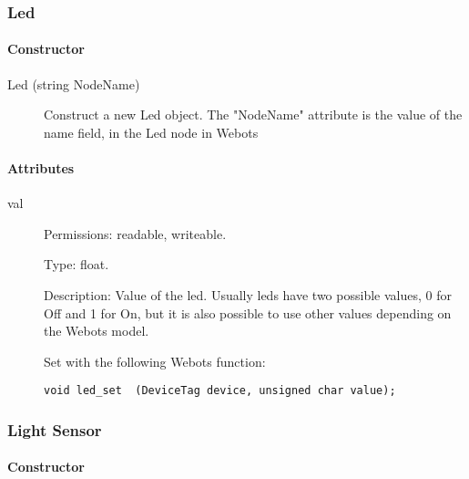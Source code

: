 \subsubsection{Led}
\label{webots.uobjects.robotdevices.led}%

\paragraph{Constructor}
\label{webots.uobjects.robotdevices.led.constructor}%

\noindent
\begin{description}
\item[{Led (string NodeName)}] Construct a new Led object. The "NodeName" attribute is the value
          of the name field, in the Led node in Webots

\end{description}

\paragraph{Attributes}
\label{webots.uobjects.robotdevices.led.attributes}%

\noindent
\begin{description}
\item[{         val
 }]            Permissions: readable, writeable.


 Type: float.


 Description: Value of the led. Usually leds have two possible values,
 0 for Off and 1 for On, but it is also possible to use other values
 depending on the Webots model.


          Set with the following Webots function:


\begin{lstlisting}
void led_set  (DeviceTag device, unsigned char value);
\end{lstlisting}
\end{description}

\subsubsection{Light Sensor}
\label{webots.uobjects.robotdevices.lightsensor}%

\paragraph{Constructor}
\label{webots.uobjects.robotdevices.lightsensor.constructor}%

